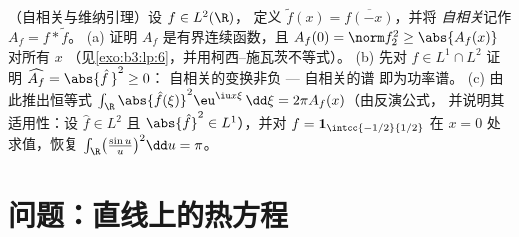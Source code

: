 \begin{exercise}[$\star\star$]\label{exo:b3:fouriertransform:12}
（自相关与维纳引理）设 $f \in L^2(\R)$，
定义 $\tilde f(x) = \overline{f(-x)}$，并将
\emph{自相关}记作 $A_f = f * \tilde f$。
(a) 证明 $A_f$ 是有界连续函数，且
$A_f(0) = \norm f_2^2 \geq \abs{A_f(x)}$ 对所有 $x$
（见\cref{exo:b3:lp:6}，并用柯西–施瓦茨不等式）。
(b) 先对 $f \in L^1\cap L^2$ 证明
$\widehat{A_f} = \abs{\hat f\,}^2 \geq 0$：
自相关的变换非负 --- 自相关的谱
即为功率谱。
(c) 由此推出恒等式 $\int_\R\abs{\hat
f(\xi)}^2\eu^{\iu x\xi}\,\dd\xi = 2\pi A_f(x)$（由反演公式，
并说明其适用性：设 $\hat f \in L^2$ 且
$\abs{\hat f}^2 \in L^1$），并对 $f = \mathbf
1_{\intcc{-1/2}{1/2}}$ 在 $x = 0$ 处求值，恢复
$\int_\R\bigl(\frac{\sin u}u\bigr)^2\dd u = \pi$。
\end{exercise}

\section{问题：直线上的热方程}

